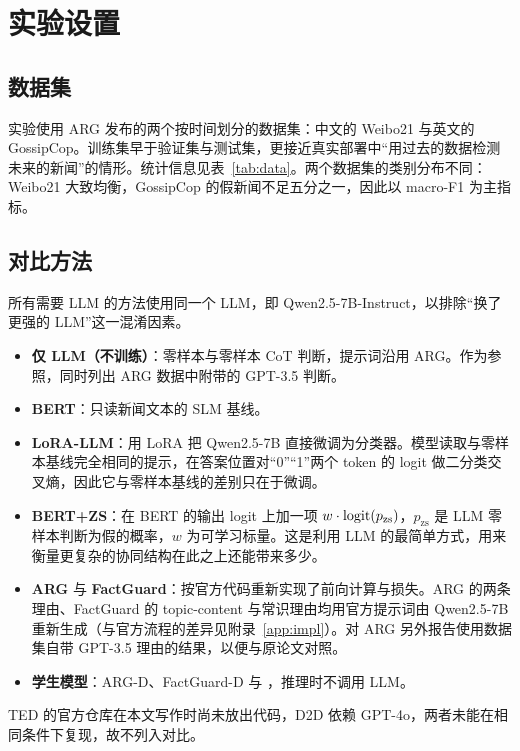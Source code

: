 \section{实验设置}\label{sec:setup}

\subsection{数据集}

实验使用 ARG\citep{hu2024bad} 发布的两个按时间划分的数据集：中文的 Weibo21\citep{nan2021mdfend} 与英文的 GossipCop\citep{shu2020fakenewsnet}。训练集早于验证集与测试集，更接近真实部署中“用过去的数据检测未来的新闻”的情形。统计信息见表~\ref{tab:data}。两个数据集的类别分布不同：Weibo21 大致均衡，GossipCop 的假新闻不足五分之一，因此以 macro-F1 为主指标。

\begin{table}[!htbp]
\centering\small
\caption{数据集统计。声明数为 Qwen2.5-7B 对每条新闻分解出的声明条数（不含整体实例）。}\label{tab:data}
\end{table}

\subsection{对比方法}

所有需要 LLM 的方法使用同一个 LLM，即 Qwen2.5-7B-Instruct\citep{qwen25}，以排除“换了更强的 LLM”这一混淆因素。

\begin{itemize}
\item \textbf{仅 LLM（不训练）}：零样本与零样本 CoT\citep{kojima2022large} 判断，提示词沿用 ARG。作为参照，同时列出 ARG 数据中附带的 GPT-3.5 判断。
\item \textbf{BERT}\citep{devlin2019bert}：只读新闻文本的 SLM 基线。
\item \textbf{LoRA-LLM}：用 LoRA\citep{hu2022lora} 把 Qwen2.5-7B 直接微调为分类器。模型读取与零样本基线完全相同的提示，在答案位置对“0”“1”两个 token 的 logit 做二分类交叉熵，因此它与零样本基线的差别只在于微调。
\item \textbf{BERT+ZS}：在 BERT 的输出 logit 上加一项 $w\cdot\operatorname{logit}(p_{\mathrm{zs}})$，$p_{\mathrm{zs}}$ 是 LLM 零样本判断为假的概率，$w$ 为可学习标量。这是利用 LLM 的最简单方式，用来衡量更复杂的协同结构在此之上还能带来多少。
\item \textbf{ARG}\citep{hu2024bad} 与 \textbf{FactGuard}\citep{he2026factguard}：按官方代码重新实现了前向计算与损失。ARG 的两条理由、FactGuard 的 topic-content 与常识理由均用官方提示词由 Qwen2.5-7B 重新生成（与官方流程的差异见附录~\ref{app:impl}）。对 ARG 另外报告使用数据集自带 GPT-3.5 理由的结果，以便与原论文对照。
\item \textbf{学生模型}：ARG-D、FactGuard-D 与 \student{}，推理时不调用 LLM。
\end{itemize}
TED\citep{liu2025ted} 的官方仓库在本文写作时尚未放出代码，D2D\citep{han2025d2d} 依赖 GPT-4o，两者未能在相同条件下复现，故不列入对比。

